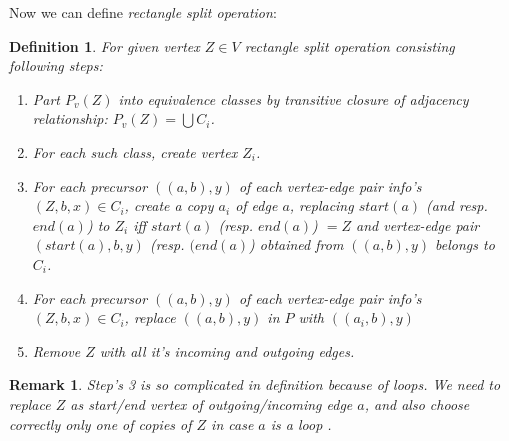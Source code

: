 \documentclass[12pt,a4paper,oneside]{article}
\newtheorem{definition}{Definition}
\newtheorem{remark}{Remark}
\begin{document}
Now we can define \emph{rectangle split operation}:
\begin{definition}
For given vertex $Z \in V$ rectangle split operation consisting following steps:
\begin{enumerate}
\item Part $P_v(Z)$ into equivalence classes by transitive closure of adjacency relationship: $P_v(Z) = \bigcup C_i$. 
\item For each such class, create vertex $Z_i$.
\item For each precursor $((a, b), y)$ of each vertex-edge pair info's $(Z, b, x) \in C_i$,  create a copy $a_i$ of edge $a$, replacing $start(a)$ (and resp. $end(a)$) to $Z_i$ iff $start(a)$ (resp. $end(a)$) $=Z$ and vertex-edge pair $(start(a), b, y)$ (resp. $(end(a)$) obtained from $((a, b), y)$ belongs to $C_i$.
\item For each precursor $((a, b), y)$ of each vertex-edge pair info's $(Z, b, x) \in C_i$, replace $((a, b), y)$ in $P$ with $((a_i, b), y)$
\item Remove $Z$ with all it's incoming and outgoing edges.
\end{enumerate} 
\end{definition} 
\begin{remark}
   Step's 3 is so complicated in definition because of loops. We need to replace $Z$ as start/end vertex of outgoing/incoming edge $a$, and also choose correctly only one of copies of $Z$ in case $a$ is a loop . 
\end{remark}
\end{document}
